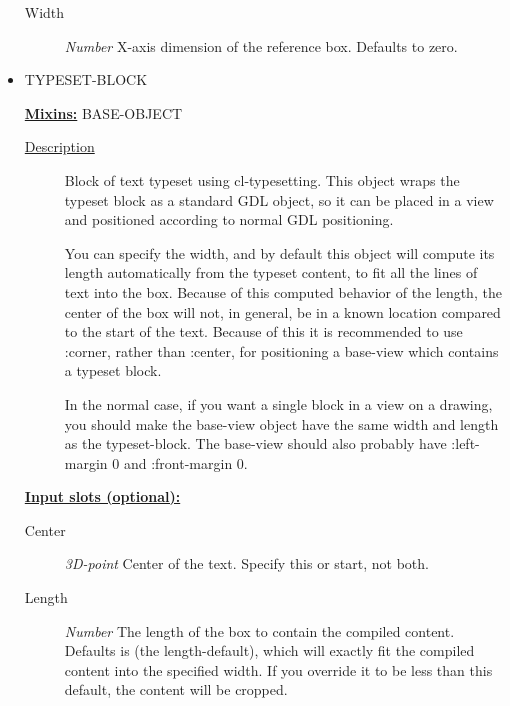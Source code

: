 \documentclass [11pt]{book}
\begin{document}
\begin{itemize}
\begin{description}
\item [Width]
\emph{Number} X-axis dimension of the reference box. Defaults to zero.


\end{description}







\item {}TYPESET-BLOCK


\textbf{
\underline{Mixins:}} BASE-OBJECT





\begin{description}

\item [
\underline{Description}]


Block of text typeset using cl-typesetting. This object
wraps the typeset block as a standard GDL object, so it can be placed in a view and 
positioned according to normal GDL positioning.

You can specify the width, and by default this object will compute its length automatically 
from the typeset content, to fit all the lines of text into the box. Because of this 
computed behavior of the length, the center of the box will not, in general, be in a 
known location compared to the start of the text. Because of this it is recommended
to use :corner, rather than :center, for positioning a base-view which contains
a typeset block. 

In the normal case, if you want a single block in a view on a drawing, you should
make the base-view object have the same width and length as the typeset-block. The
base-view should also probably have :left-margin 0 and :front-margin 0.



\end{description}








\textbf{
\underline{Input slots (optional):}}

\begin{description}

\item [Center]
\emph{3D-point} Center of the text. Specify this or start, not both.


\item [Length]
\emph{Number} The length of the box to contain the compiled content. Defaults is (the length-default),
which will exactly fit the compiled content into the specified width. If you override it to be less
than this default, the content will be cropped.



\end{description}
\end{itemize}
\end{document}
